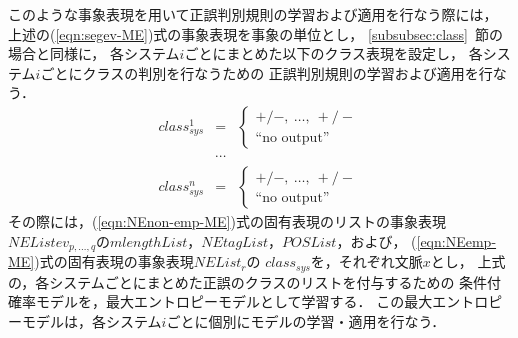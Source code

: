 このような事象表現を用いて正誤判別規則の学習および適用を行なう際には，
上述の(\ref{eqn:segev-ME})式の事象表現を事象の単位とし，
\ref{subsubsec:class}~節の場合と同様に，
各システム$i$ごとにまとめた以下のクラス表現を設定し，
各システム$i$ごとにクラスの判別を行なうための
正誤判別規則の学習および適用を行なう．
\begin{eqnarray*}
class_{sys}^1  & = & 
	\left\{\begin{array}{l}
	  +/-,\ \ldots,\ +/- \\
	 \mbox{``no output''} 
	\end{array}\right. \nonumber \\
         & \cdots &  \\
class_{sys}^n  & = & 
	\left\{\begin{array}{l}
	  +/-,\ \ldots,\ +/- \\
	 \mbox{``no output''} 
	\end{array}\right. \nonumber 
\end{eqnarray*}
その際には，(\ref{eqn:NEnon-emp-ME})式の固有表現のリストの事象表現
$NEListev_{p,\ldots,q}$の$mlengthList$，$NEtagList$，$POSList$，および，
(\ref{eqn:NEemp-ME})式の固有表現の事象表現$NEList_{r}$の
$class_{sys}$を，それぞれ文脈$x$とし，
上式の，各システムごとにまとめた正誤のクラスのリストを付与するための
条件付確率モデルを，最大エントロピーモデルとして学習する．
この最大エントロピーモデルは，各システム$i$ごとに個別にモデルの学習・適用を行なう．

